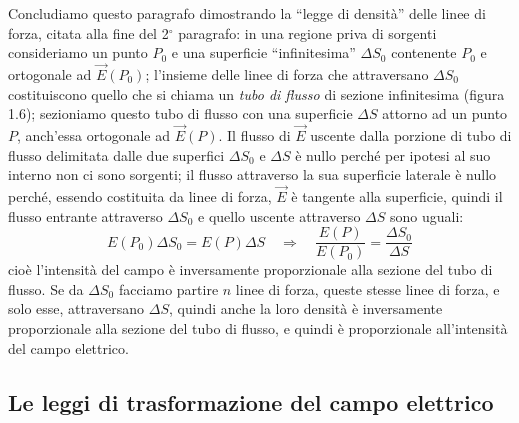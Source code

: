 Concludiamo questo paragrafo dimostrando la ``legge di densità'' delle linee di forza, citata alla fine del 2$^\circ$ paragrafo: in una regione priva di sorgenti consideriamo un punto $P_0$ e una superficie ``infinitesima'' $\Delta S_0$ contenente $P_0$ e ortogonale ad $\vec E(P_0)$; l'insieme delle linee di forza che attraversano $\Delta S_0$ costituiscono quello che si chiama un \emph{tubo di flusso} di sezione infinitesima (figura 1.6); sezioniamo questo tubo di flusso con una superficie $\Delta S$ attorno ad un punto $P$, anch'essa ortogonale ad $\vec E(P)$. Il flusso di $\vec E$ uscente dalla porzione di tubo di flusso delimitata dalle due superfici $\Delta S_0$ e $\Delta S$ è nullo perché per ipotesi al suo interno non ci sono sorgenti; il flusso attraverso la sua superficie laterale è nullo perché, essendo costituita da linee di forza, $\vec E$ è tangente alla superficie, quindi il flusso entrante attraverso $\Delta S_0$ e quello uscente attraverso $\Delta S$ sono uguali:
\begin{equation}
E(P_0)\Delta S_0=E(P)\Delta S\quad\Rightarrow\quad\frac{E(P)}{E(P_0)}=\frac{\Delta S_0}{\Delta S}
\tag{1.36}
\end{equation}
cioè l'intensità del campo è inversamente proporzionale alla sezione del tubo di flusso. Se da $\Delta S_0$ facciamo partire $n$ linee di forza, queste stesse linee di forza, e solo esse, attraversano $\Delta S$, quindi anche la loro densità è inversamente proporzionale alla sezione del tubo di flusso, e quindi è proporzionale all'intensità del campo elettrico.

\subsection{Le leggi di trasformazione del campo elettrico}

